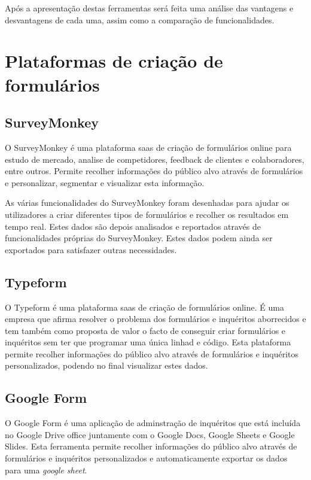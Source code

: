 Após a apresentação destas ferramentas será feita uma análise das vantagens e desvantagens de cada uma, assim como a comparação de funcionalidades.

\section{Plataformas de criação de formulários}
\label{formulários}

\subsection{SurveyMonkey}
\label{surveyMonkeyM}

O SurveyMonkey é uma plataforma \acrfull{saas} de criação de formulários online para estudo de mercado, analise de competidores, feedback de clientes e colaboradores, entre outros. Permite recolher informações do público alvo através de formulários e personalizar, segmentar e visualizar esta informação.

As várias funcionalidades do SurveyMonkey foram desenhadas para ajudar os utilizadores a criar diferentes tipos de formulários e recolher os resultados em tempo real. Estes dados são depois analisados e reportados através de funcionalidades próprias do SurveyMonkey. Estes dados podem ainda ser exportados para satisfazer outras necessidades. 

\subsection{Typeform}
\label{typeformM}

O Typeform é uma plataforma \acrshort{saas} de criação de formulários online. É uma empresa que afirma resolver o problema dos formulários e inquéritos aborrecidos e tem também como proposta de valor o facto de conseguir criar formulários e inquéritos sem ter que programar uma única linhad e código. Esta plataforma permite recolher informações do público alvo através de formulários e inquéritos personalizados, podendo no final visualizar estes dados. 


\subsection{Google Form}
\label{googleformM}

O Google Form é uma aplicação de adminstração de inquéritos que está incluída no Google Drive office juntamente com o Google Docs\cite{gdocs}, Google Sheets e Google Slides\cite{gslides}. Esta ferramenta permite recolher informações do público alvo através de formulários e inquéritos personalizados e automaticamente exportar os dados para uma \textit{google sheet}.

